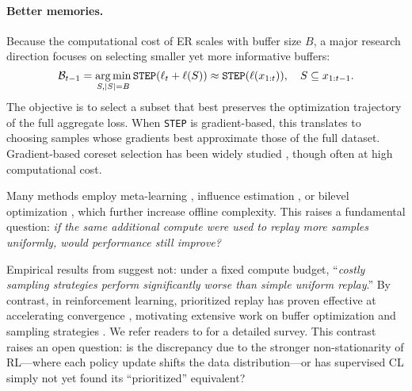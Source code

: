 \documentclass[10pt]{article} %
\DeclareMathOperator*{\argmin}{arg\,min}
\begin{document}
\paragraph{Better memories.}
Because the computational cost of ER scales with buffer size $B$, a major research direction focuses on selecting smaller yet more informative buffers:
\[
\mathcal{B}_{t-1} = 
\argmin_{S, |S| = B}
\texttt{STEP}(\loss_t + \loss(S)) 
\approx \texttt{STEP}(\loss(x_{1:t})), 
\quad S \subseteq x_{1:t-1}.
\]
The objective is to select a subset that best preserves the optimization trajectory of the full aggregate loss.  
When \texttt{STEP} is gradient-based, this translates to choosing samples whose gradients best approximate those of the full dataset.  
Gradient-based coreset selection has been widely studied \citep{aljundiGradientBasedSample2019,borsosCoresetsBilevelOptimization2020a,yoonOnlineCoresetSelection2021,tiwariGCRGradientCoreset2022}, though often at high computational cost.  

Many methods employ meta-learning \citep{riemerLearningLearnForgetting2018}, influence estimation \citep{sunExploringExampleInfluence2022}, or bilevel optimization \citep{aljundiOnlineContinualLearning2019,chaudhryUsingHindsightAnchor2021}, which further increase offline complexity.  
This raises a fundamental question:  
\emph{if the same additional compute were used to replay more samples uniformly, would performance still improve?}

Empirical results from \citet{prabhuComputationallyBudgetedContinual2023} suggest not: under a fixed compute budget, “\emph{costly sampling strategies perform significantly worse than simple uniform replay}.”  
By contrast, in reinforcement learning, prioritized replay has proven effective at accelerating convergence \citep{schaulPRIORITIZEDEXPERIENCEREPLAY2016}, motivating extensive work on buffer optimization and sampling strategies \citep{zhaExperienceReplayOptimization2019,sunAttentiveExperienceReplay2020,nevesWhenLessMay2022}.  
We refer readers to \citet{nevesAdvancesChallengesLearning2024} for a detailed survey.  
This contrast raises an open question:  
is the discrepancy due to the stronger non-stationarity of RL—where each policy update shifts the data distribution—or has supervised CL simply not yet found its “prioritized” equivalent?
\end{document}
